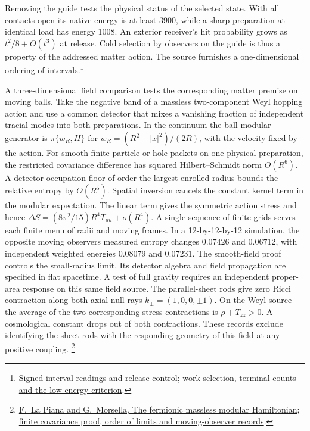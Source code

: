 \documentclass[11pt]{article}
\begin{document}
Removing the guide tests the physical status of the selected state.
With all contacts open its native energy is at least 3900, while a
sharp preparation at identical load has energy 1008. An exterior
receiver's hit probability grows as $t^2/8+O(t^3)$ at release. Cold
selection by observers on the guide is thus a property of the
addressed matter action. The source furnishes a one-dimensional
ordering of intervals.\footnote{\href{https://github.com/FloatingPragma/observer-patch-holography/tree/main/model/experiments/interval_echo_einstein_station/critical_exchange}{Signed interval readings and release control};
\href{https://github.com/FloatingPragma/observer-patch-holography/tree/main/model/experiments/interval_echo_einstein_station/critical_exchange/selection}{work selection, terminal counts and the low-energy criterion}.}

A three-dimensional field comparison tests the corresponding matter
premise on moving balls. Take the negative band of a massless two-component
Weyl hopping action and use a common detector that mixes a vanishing
fraction of independent tracial modes into both preparations. In the
continuum the ball modular generator is $\pi\{w_R,H\}$ for
$w_R=(R^2-|x|^2)/(2R)$, with the velocity fixed by the action.
For smooth finite particle or hole packets on one physical preparation,
the restricted covariance difference has squared Hilbert--Schmidt norm
$O(R^6)$. A detector occupation floor of order the largest enrolled
radius bounds the relative entropy by $O(R^5)$. Spatial inversion
cancels the constant kernel term in the modular expectation. The
linear term gives the symmetric action stress and hence
$\Delta S=(8\pi^2/15)R^4 T_{uu}+o(R^4)$. A single sequence of finite
grids serves each finite menu of radii and moving frames. In a
12-by-12-by-12 simulation, the opposite moving observers measured
entropy changes $0.07426$ and $0.06712$, with independent weighted
energies $0.08079$ and $0.07231$. The smooth-field proof controls the
small-radius limit. Its detector algebra and field propagation are
specified in flat spacetime. A test of full gravity requires an
independent proper-area response on this same field source. The
parallel-sheet rods give zero Ricci contraction along both axial
null rays $k_\pm=(1,0,0,\pm1)$. On the Weyl source the average of the
two corresponding stress contractions is $\rho+T_{zz}>0$.
A cosmological constant drops out of both contractions. These records
exclude identifying the sheet rods with the responding geometry of
this field at any positive coupling.
\footnote{\href{https://arxiv.org/abs/2405.07888}{F.~La Piana and G.~Morsella, The fermionic massless modular Hamiltonian};
\href{https://github.com/FloatingPragma/observer-patch-holography/tree/main/code/matched_einstein_limit/source_implication/modular_orbit/weyl_balls}{finite covariance proof, order of limits and moving-observer records}.}
\end{document}
